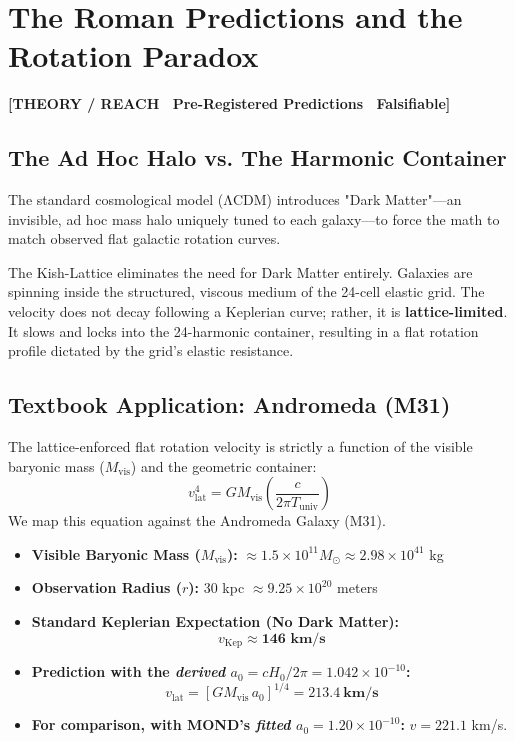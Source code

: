 \documentclass[11pt, letterpaper, openany]{book}
\begin{document}
\chapter{The Roman Predictions and the Rotation Paradox}

\begin{center}
{\color{theorytag}\textbf{[THEORY / REACH \textbullet\ Pre-Registered Predictions \textbullet\ Falsifiable]}}
\end{center}

\section{The Ad Hoc Halo vs. The Harmonic Container}

The standard cosmological model (ΛCDM) introduces "Dark Matter"—an invisible, ad hoc mass halo uniquely tuned to each galaxy—to force the math to match observed flat galactic rotation curves.

The Kish-Lattice eliminates the need for Dark Matter entirely. Galaxies are spinning inside the structured, viscous medium of the 24-cell elastic grid. The velocity does not decay following a Keplerian curve; rather, it is \textbf{lattice-limited}. It slows and locks into the 24-harmonic container, resulting in a flat rotation profile dictated by the grid's elastic resistance.

\section{Textbook Application: Andromeda (M31)}

The lattice-enforced flat rotation velocity is strictly a function of the visible baryonic mass ($M_{\text{vis}}$) and the geometric container:
\[
v_{\text{lat}}^4 = G M_{\text{vis}} \left( \frac{c}{2\pi T_{\text{univ}}} \right)
\]
We map this equation against the Andromeda Galaxy (M31).

\begin{itemize}
    \item \textbf{Visible Baryonic Mass ($M_{\text{vis}}$):} $\approx 1.5 \times 10^{11} M_\odot \approx 2.98 \times 10^{41}$ kg
    \item \textbf{Observation Radius ($r$):} 30 kpc $\approx 9.25 \times 10^{20}$ meters
    \item \textbf{Standard Keplerian Expectation (No Dark Matter):} 
    \[
    v_{\text{Kep}} \approx \mathbf{146 \text{ km/s}}
    \]
    \item \textbf{Prediction with the \emph{derived} $a_0 = cH_0/2\pi = 1.042\times10^{-10}$:}
    \[
    v_{\text{lat}} = \left[ G M_{\text{vis}}\, a_0 \right]^{1/4} = \mathbf{213.4\ \text{km/s}}
    \]
    \item \textbf{For comparison, with MOND's \emph{fitted} $a_0 = 1.20\times10^{-10}$:}
    $v = 221.1$ km/s.
\end{itemize}
\end{document}
